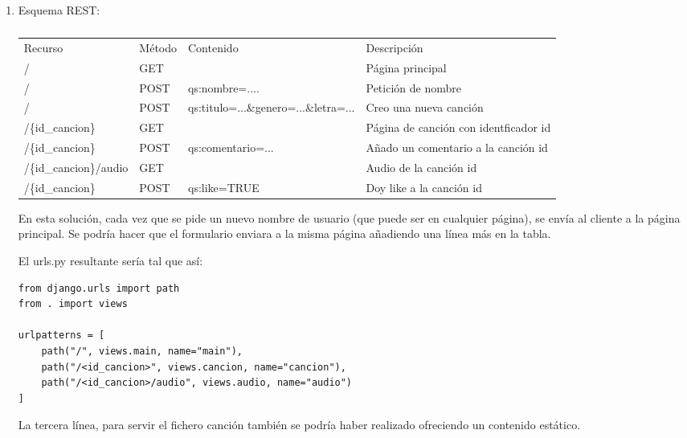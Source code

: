 \begin{enumerate}
  \item Esquema REST:

\begin{table}[]
\begin{tabular}{llll}
Recurso                & Método & Contenido                                            & Descripción                           \\
/                      & GET    &                                                      & Página principal                      \\
/                      & POST   & qs:nombre=....                                       & Petición de nombre                    \\
/                      & POST   & qs:titulo=...\&genero=...\&letra=...         & Creo una nueva canción                \\
/\{id\_cancion\}       & GET    &                                                      & Página de canción con identficador id \\
/\{id\_cancion\}       & POST   & qs:comentario=...                                    & Añado un comentario a la canción id   \\
/\{id\_cancion\}/audio & GET    &                                                      & Audio de la canción id                \\
/\{id\_cancion\}       & POST   & qs:like=TRUE                                         & Doy like a la canción id              \\
\end{tabular}
\caption{}
\label{tab:my-table}
\end{table}

En esta solución, cada vez que se pide un nuevo nombre de usuario (que puede ser en cualquier página), se envía al cliente a la página principal. Se podría hacer que el formulario enviara a la misma página añadiendo una línea más en la tabla.

El urls.py resultante sería tal que así:

\begin{verbatim}
from django.urls import path
from . import views

urlpatterns = [
    path("/", views.main, name="main"),
    path("/<id_cancion>", views.cancion, name="cancion"),
    path("/<id_cancion>/audio", views.audio, name="audio")
]
\end{verbatim}

La tercera línea, para servir el fichero canción también se podría haber realizado ofreciendo un contenido estático.


\end{enumerate}
